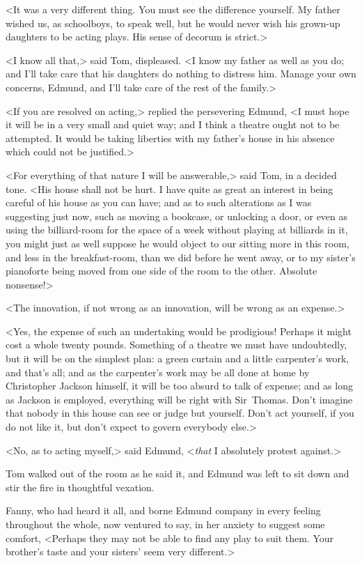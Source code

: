 <It was a very different thing. You must see the difference yourself. My father wished us, as schoolboys, to speak well, but he would never wish his grown-up daughters to be acting plays. His sense of decorum is strict.>

<I know all that,> said Tom, displeased. <I know my father as well as you do; and I'll take care that his daughters do nothing to distress him. Manage your own concerns, Edmund, and I'll take care of the rest of the family.>

<If you are resolved on acting,> replied the persevering Edmund, <I must hope it will be in a very small and quiet way; and I think a theatre ought not to be attempted. It would be taking liberties with my father's house in his absence which could not be justified.>

<For everything of that nature I will be answerable,> said Tom, in a decided tone. <His house shall not be hurt. I have quite as great an interest in being careful of his house as you can have; and as to such alterations as I was suggesting just now, such as moving a bookcase, or unlocking a door, or even as using the billiard-room for the space of a week without playing at billiards in it, you might just as well suppose he would object to our sitting more in this room, and less in the breakfast-room, than we did before he went away, or to my sister's pianoforte being moved from one side of the room to the other. Absolute nonsense!>

<The innovation, if not wrong as an innovation, will be wrong as an expense.>

<Yes, the expense of such an undertaking would be prodigious! Perhaps it might cost a whole twenty pounds. Something of a theatre we must have undoubtedly, but it will be on the simplest plan: a green curtain and a little carpenter's work, and that's all; and as the carpenter's work may be all done at home by Christopher Jackson himself, it will be too absurd to talk of expense; and as long as Jackson is employed, everything will be right with Sir~Thomas. Don't imagine that nobody in this house can see or judge but yourself. Don't act yourself, if you do not like it, but don't expect to govern everybody else.>

<No, as to acting myself,> said Edmund, <\textit{that}  I absolutely protest against.>

Tom walked out of the room as he said it, and Edmund was left to sit down and stir the fire in thoughtful vexation.

Fanny, who had heard it all, and borne Edmund company in every feeling throughout the whole, now ventured to say, in her anxiety to suggest some comfort, <Perhaps they may not be able to find any play to suit them. Your brother's taste and your sisters' seem very different.>

